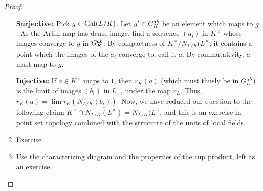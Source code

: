 \begin{proof}
\begin{enumerate}[(1)]
			\textbf{Surjective:}
			Pick \(g \in \operatorname{Gal}(L / K)\). 
			Let \(g^{\prime} \in G_{K}^{ab}\) 
			be an element which maps to \(g\). 
			As the Artin map has dense image, 
			find a sequence \((a_{i})\) in \(K^{\times}\)
			whose images converge to \(g\) in \(G_{K}^{ab}\).
			By compactness of \(K^{\times} / N_{L / K}(L^{\times}\),
			it contains a point which the images
			of the \(a_{i}\) converge to, call it \(a\). 
			By commutativity, \(a\) must map to \(g\). 

			\textbf{Injective:} 
			If \(a \in K^{\times}\) maps to \(1\),
			then \(r_{K}(a)\) (which must thusly be
			in \(G_{L}^{ab}\)) is
			the limit of images \((b_{i})\) 
			in \(L^{\times}\), under the map
			\(r_{L}\). 
			Thus, \(r_{K}(a) = \lim r_{K}(N_{L / K}(b_{i}))\).
			Now, we have reduced our question
			to the following claim:
			\(K^{\times} \cap \overline{N_{L / K}(L^{\times})}
			= N_{L / K}(L^{\times}\),
			and this is an exercise in 
			point set topology combined with the 
			strucutre of the units of local fields.

		\item Exercise
		\item Use the characterizing diagram
			and the properties of the cup product, 
			left as an exercise.
	\end{enumerate}
\end{proof}



